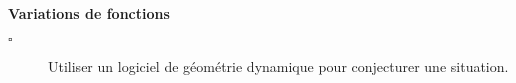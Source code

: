\begin{titreTice}

\end{titreTice}


\begin{CpsCol}
\textbf{Variations de fonctions}
\begin{description}
\item[$\square$] Utiliser un logiciel de géométrie dynamique pour conjecturer une situation.
\end{description}
\end{CpsCol}


